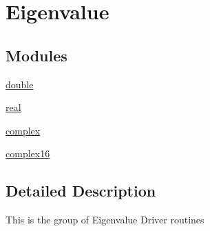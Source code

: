 \hypertarget{group__eigenSY}{}\section{Eigenvalue}
\label{group__eigenSY}
\subsection*{Modules}
\begin{DoxyCompactItemize}
\item 
\hyperlink{group__doubleSYeigen}{double}
\item 
\hyperlink{group__realSYeigen}{real}
\item 
\hyperlink{group__complexSYeigen}{complex}
\item 
\hyperlink{group__complex16SYeigen}{complex16}
\end{DoxyCompactItemize}


\subsection{Detailed Description}
This is the group of Eigenvalue Driver routines 